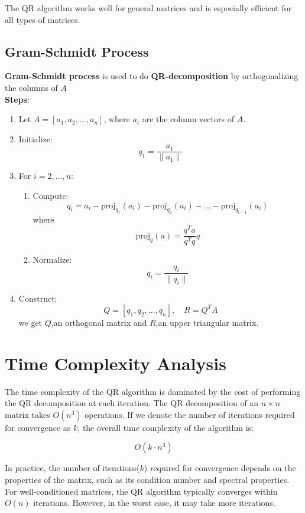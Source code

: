 \documentclass{article}
\begin{document}
The QR algorithm works well for general matrices and is especially efficient for all types of matrices.
\subsection{Gram-Schmidt Process}
 \textbf{Gram-Schmidt process} is used to do \textbf{QR-decomposition} by orthogonalizing the columns of \( A \)\\
\textbf{Steps}:
\begin{enumerate}
    \item Let \( A = [a_1, a_2, \dots, a_n] \), where \( a_i \) are the column vectors of \( A \).
    \item Initialize:
    \[
    q_1 = \frac{a_1}{\|a_1\|}
    \]
    \item For \( i = 2, \dots, n \):
    \begin{enumerate}
        \item Compute:
        \[
        q_i = a_i - \text{proj}_{q_1}(a_i) - \text{proj}_{q_2}(a_i) - \dots - \text{proj}_{q_{i-1}}(a_i)
        \]
        where
        \[
        \text{proj}_{q}(a) = \frac{q^T a}{q^T q} q
        \]
        \item Normalize:
        \[
        q_i = \frac{q_i}{\|q_i\|}
        \]
    \end{enumerate}
    \item Construct:
    \[
    Q = [q_1, q_2, \dots, q_n], \quad R = Q^T A
    \]
    we get $Q$,an orthogonal matrix and 
    $R$,an upper triangular matrix.
\end{enumerate}
\section{Time Complexity Analysis}

The time complexity of the QR algorithm is dominated by the cost of performing the QR decomposition at each iteration. The QR decomposition of an \( n \times n \) matrix takes \( O(n^3) \) operations. If we denote the number of iterations required for convergence as \( k \), the overall time complexity of the algorithm is:

\[O(k \cdot n^3)\]

In practice, the number of iterations($k$) required for convergence depends on the properties of the matrix, such as its condition number and spectral properties. For well-conditioned matrices, the QR algorithm typically converges within \( O(n) \) iterations. However, in the worst case, it may take more iterations.
\end{document}
